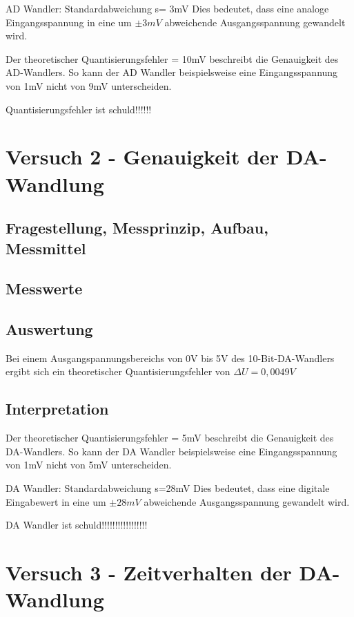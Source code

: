 \documentclass[12pt,oneside,a4paper]{report}
\begin{document}
AD Wandler:
Standardabweichung s= 3mV
Dies bedeutet, dass eine analoge Eingangsspannung in eine um $\pm3mV$ abweichende Ausgangsspannung gewandelt wird.

Der theoretischer Quantisierungsfehler = 10mV beschreibt die Genauigkeit des AD-Wandlers. So kann der AD Wandler beispielsweise eine Eingangsspannung von 1mV nicht von 9mV unterscheiden.

Quantisierungsfehler ist schuld!!!!!!

%
%
\chapter{Versuch 2 - Genauigkeit der DA-Wandlung}
\label{chap:VERSUCH_2}


\section{Fragestellung, Messprinzip, Aufbau, Messmittel}
\label{chap:VERSUCH_2_FRAGESTELLUNG}

\section{Messwerte}
\label{chap:VERSUCH_2_MESSWERTE}


\section{Auswertung}
\label{chap:VERSUCH_2_AUSWERTUNG}
Bei einem Ausgangspannungsbereichs von 0V bis 5V des 10-Bit-DA-Wandlers ergibt sich ein theoretischer Quantisierungsfehler von $\Delta U = 0,0049 V$

\section{Interpretation}
\label{chap:VERSUCH_2_INTERPRETATION}
Der theoretischer Quantisierungsfehler = 5mV beschreibt die Genauigkeit des DA-Wandlers. So kann der DA Wandler beispielsweise eine Eingangsspannung von 1mV nicht von 5mV unterscheiden.

DA Wandler:
Standardabweichung s=28mV
Dies bedeutet, dass eine digitale Eingabewert in eine um $\pm28mV$ abweichende Ausgangsspannung gewandelt wird.

DA Wandler ist schuld!!!!!!!!!!!!!!!!!

%
%
\chapter{Versuch 3 - Zeitverhalten der DA-Wandlung}
\label{chap:VERSUCH_3}
\end{document}

